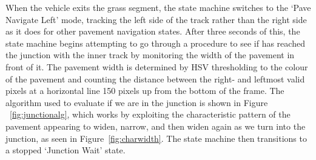 \documentclass[titlepage, twocolumn]{article}
\begin{document}
            When the vehicle exits the grass segment, the state machine switches to the `Pave Navigate Left' mode, tracking the left side of the track rather than the right side as it does for other pavement navigation states. After three seconds of this, the state machine begins attempting to go through a procedure to see if has reached the junction with the inner track by monitoring the width of the pavement in front of it. The pavement width is determined by HSV thresholding to the colour of the pavement and counting the distance between the right- and leftmost valid pixels at a horizontal line 150 pixels up from the bottom of the frame. The algorithm used to evaluate if we are in the junction is shown in Figure ~\ref{fig:junctionalg}, which works by exploiting the characteristic pattern of the pavement appearing to widen, narrow, and then widen again as we turn into the junction, as seen in Figure~\ref{fig:charwidth}. The state machine then transitions to a stopped `Junction Wait' state. 
\end{document}
